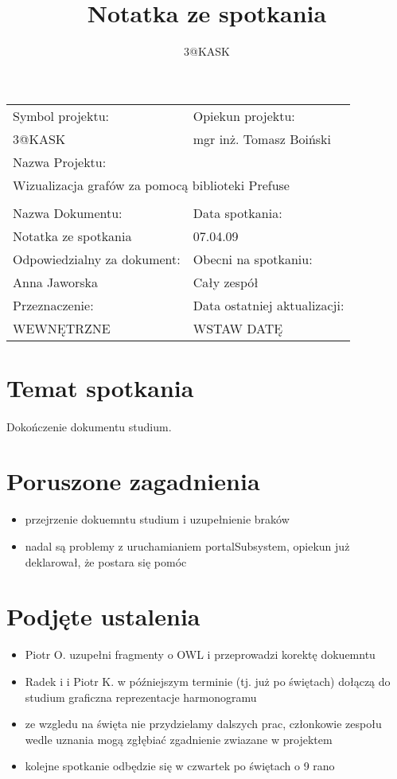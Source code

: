 \documentclass[a4paper,10pt]{article}
\title{Notatka ze spotkania}
\author{3@KASK}
\begin{document}



\maketitle


\begin{center}
\begin{tabular}{|p{7cm}|p{7cm}|}
\hline
Symbol projektu: & Opiekun projektu:   \tabularnewline 
3@KASK & mgr inż. Tomasz Boiński    \tabularnewline \hline
\multicolumn{2}{|l|}{Nazwa Projektu: } \tabularnewline
\multicolumn{2}{|l|}{Wizualizacja grafów za pomocą biblioteki Prefuse } \tabularnewline 
\hline
\multicolumn{2}{l}{ } \tabularnewline %
\hline 
Nazwa Dokumentu: & Data spotkania:   \tabularnewline 
Notatka ze spotkania & 07.04.09 \tabularnewline \hline
Odpowiedzialny za dokument: & Obecni na spotkaniu:   \tabularnewline 
Anna Jaworska & Cały zespół \tabularnewline \hline
Przeznaczenie: & Data ostatniej aktualizacji:   \tabularnewline 
WEWNĘTRZNE & WSTAW DATĘ \tabularnewline \hline
\end{tabular}
\end{center}



\section{Temat spotkania}
\paragraph{} Dokończenie dokumentu studium. 


\section{Poruszone zagadnienia}
\begin{itemize}
 \item przejrzenie dokuemntu studium i uzupełnienie braków
 \item nadal są problemy z uruchamianiem portalSubsystem, opiekun już deklarował, że postara się pomóc 
\end{itemize}



\section{Podjęte ustalenia}
\begin{itemize}
 \item Piotr O. uzupełni fragmenty o OWL i przeprowadzi korektę dokuemntu
\item Radek i i Piotr K. w późniejszym terminie (tj. już po świętach) dołączą do studium graficzna reprezentacje harmonogramu
\item ze wzgledu na święta nie przydzielamy dalszych prac, członkowie zespołu wedle uznania mogą zgłębiać zgadnienie zwiazane w projektem
\item kolejne spotkanie odbędzie się w czwartek po świętach o 9 rano 


\end{itemize}
\end{document}

